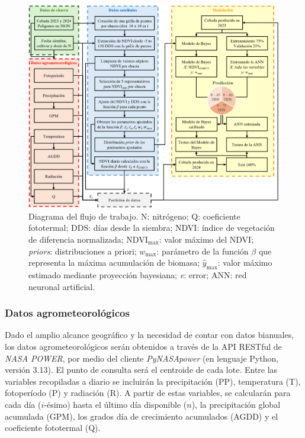 \documentclass[
11pt, %
]{charter}
\begin{document}
\begin{figure}[htpb]
\centering 
\includegraphics[width=.99\textwidth]{./Figuras/Flujo_de_Trabajo.png}
\caption{Diagrama del flujo de trabajo. N: nitrógeno; Q: coeficiente fototermal; DDS: días desde la siembra; NDVI: índice de vegetación de diferencia normalizada; NDVI$_{\max}$: valor máximo del NDVI; \emph{priors}: distribuciones a priori; $w_{\max}$: parámetro de la función $\beta$ que representa la máxima acumulación de biomasa; $\hat{y}_{\max}$: valor máximo estimado mediante proyección bayesiana; \emph{e}: error; ANN: red neuronal artificial.}

\label{fig:Flujo_de_Trabajo}
\end{figure}


\subsubsection{Datos agrometeorológicos}
\label{sec:descripcion}
Dado el amplio alcance geográfico y la necesidad de contar con datos bianuales, los datos agrometeorológicos serán obtenidos a través de la API RESTful de \textit{NASA POWER}, por medio del cliente \textit{PyNASApower} (en lenguaje Python, versión 3.13). El punto de consulta será el centroide de cada lote. Entre las variables recopiladas a diario se incluirán la precipitación (PP), temperatura (T), fotoperíodo (P) y radiación (R). A partir de estas variables, se calcularán para cada día ($i$-ésimo) hasta el último día disponible ($n$), la precipitación global acumulada (GPM), los grados día de crecimiento acumulados (AGDD) y el coeficiente fototermal (Q).
\end{document}
